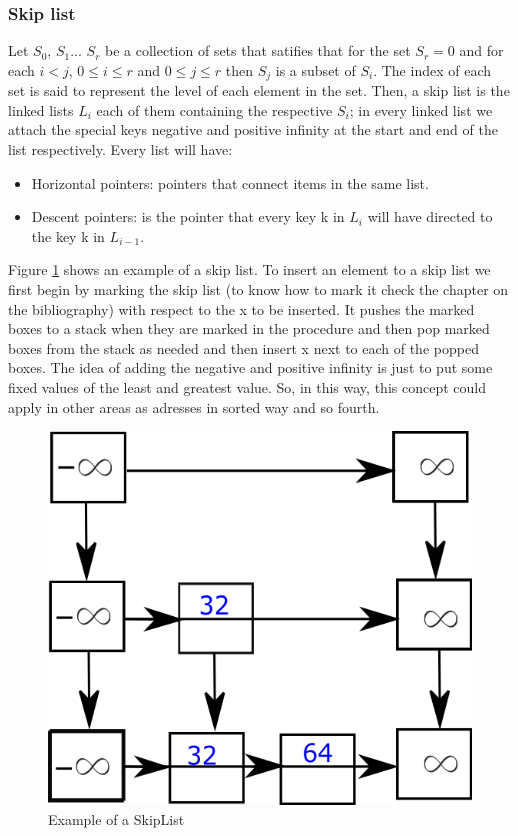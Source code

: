 \documentclass{sig-alternate-05-2015}
\begin{document}
    \subsubsection{Skip list}
      Let $S_{0}$, $S_{1}$... $S_r$ be a collection of sets that satifies that for the set $S_r = 0$ and for each $i<j$, $0\leq i \leq r$ and $0\leq j\leq r$ then
      $S_j$ is a subset of $S_i$. The index of each set is said to represent the level of each element in the set. Then, a skip list
      is the linked lists $L_i$ each of them containing the respective $S_i$; in every linked list we attach the special keys negative
      and positive infinity at the start and end of the list respectively. Every list will have:
      \begin{itemize}
        \item Horizontal pointers: pointers that connect items in the same list.
        \item Descent pointers: is the pointer that every key k in $L_i$ will have directed to the key k in $L_{i-1}$.
      \end{itemize}
      Figure \ref{img:skipList} shows an example of a skip list.
      To insert an element to a skip list we first begin by marking the skip list (to know how to mark it check the chapter on
      the bibliography) with respect to the x to be inserted. It pushes the marked boxes to a stack when they are
      marked in the procedure and then pop marked boxes from the stack as needed and then insert x next to each of the popped
      boxes.
      The idea of adding the negative and positive infinity is just to put some fixed values of the least and greatest
      value. So, in this way, this concept could apply in other areas as adresses in sorted way and so fourth.\cite{Mehta:Handbook}
      \begin{figure}
        \centering
        \includegraphics[scale=0.4]{SkipList.png}
        \caption{Example of a SkipList}
        \label{img:skipList}
      \end{figure}

  
  
\end{document}
